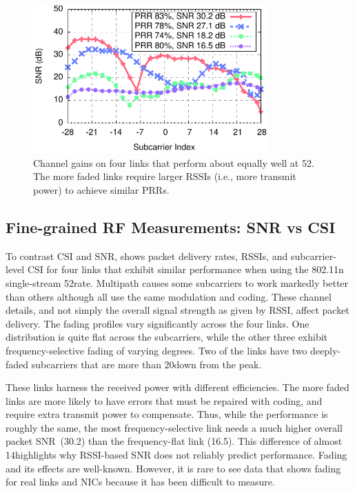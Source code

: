 \begin{figure}[t]
  \centering
  \includegraphics[width=0.8\textwidth]{figures/fsf_shape.pdf}
  \caption{Channel gains on four links that perform about equally well at 52\Mbps. The more faded links require larger RSSIs (i.e., more transmit power) to achieve similar PRRs.}
  \label{fig:example_fsf_shape}

\end{figure}

\subsection{Fine-grained RF Measurements: SNR vs CSI}
To contrast CSI and SNR,  shows packet delivery rates, RSSIs, and subcarrier-level CSI for four links that exhibit similar performance when using the 802.11n single-stream 52\Mbps rate. Multipath causes some subcarriers to work markedly better than others although all use the same modulation and coding. These channel details, and not simply the overall signal strength as given by RSSI, affect packet delivery. The fading profiles vary significantly across the four links. One distribution is quite flat across the subcarriers, while the other three exhibit frequency-selective fading of varying degrees. Two of the links have two deeply-faded subcarriers that are more than 20\dB down from the peak.

These links harness the received power with different efficiencies.
The more faded links are more likely to have errors that must be repaired with coding, and require extra transmit power to compensate. Thus, while the performance is roughly the same, the most frequency-selective link needs a much higher overall packet SNR~(30.2\dB) than the frequency-flat link (16.5\dB). This difference of almost 14\dB highlights why RSSI-based SNR does not reliably predict performance. Fading and its effects are well-known. However, it is rare to see data that shows fading for real links and NICs because it has been difficult to measure.

